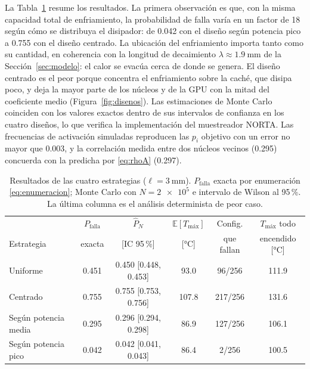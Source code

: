 \documentclass[preprint,11pt,sort&compress]{elsarticle}
\newcommand{\Pf}{P_{\mathrm{falla}}}
\newcommand{\Tmax}{T_{\mathrm{máx}}}
\begin{document}
La Tabla~\ref{tab:resultados} resume los resultados. La primera observación es que, con la
misma capacidad total de enfriamiento, la probabilidad de falla varía en un factor de 18
según cómo se distribuya el disipador: de \num{0.042} con el diseño según potencia pico a
\num{0.755} con el diseño centrado. La ubicación del enfriamiento importa tanto como su
cantidad, en coherencia con la longitud de decaimiento $\lambda\approx\SI{1.9}{\milli\metre}$
de la Sección~\ref{sec:modelo}: el calor se evacúa cerca de donde se genera. El diseño
centrado es el peor porque concentra el enfriamiento sobre la caché, que disipa poco, y deja
la mayor parte de los núcleos y de la GPU con la mitad del coeficiente medio
(Figura~\ref{fig:disenos}). Las estimaciones de Monte Carlo coinciden con los valores
exactos dentro de sus intervalos de confianza en los cuatro diseños, lo que verifica la
implementación del muestreador NORTA. Las frecuencias de activación simuladas reproducen
las $p_i$ objetivo con un error no mayor que \num{0.003}, y la correlación medida entre dos
núcleos vecinos (\num{0.295}) concuerda con la predicha por \eqref{eq:rhoA} (\num{0.297}).

\begin{table}[htbp]
\centering
\caption{Resultados de las cuatro estrategias ($\ell=\SI{3}{\milli\metre}$). $\Pf$ exacta
por enumeración \eqref{eq:enumeracion}; Monte Carlo con $N=\num{2e5}$ e intervalo de Wilson
al 95\,\%. La última columna es el análisis determinista de peor caso.}
\label{tab:resultados}
\small
\setlength{\tabcolsep}{4pt}
\begin{tabular}{@{}lccccc@{}}
\toprule
 & $\Pf$ & $\hat P_N$ & $\mathbb E[\Tmax]$ & Config. & $\Tmax$ todo \\
Estrategia & exacta & [IC 95\,\%] & [\si{\celsius}] & que fallan & encendido [\si{\celsius}] \\
\midrule
Uniforme             & \num{0.451} & \num{0.450} [\num{0.448}, \num{0.453}] & \num{93.0}  & 96/256  & \num{111.9} \\
Centrado             & \num{0.755} & \num{0.755} [\num{0.753}, \num{0.756}] & \num{107.8} & 217/256 & \num{131.6} \\
Según potencia media & \num{0.295} & \num{0.296} [\num{0.294}, \num{0.298}] & \num{86.9}  & 127/256 & \num{106.1} \\
Según potencia pico  & \num{0.042} & \num{0.042} [\num{0.041}, \num{0.043}] & \num{86.4}  & 2/256   & \num{100.5} \\
\bottomrule
\end{tabular}
\end{table}
\end{document}
